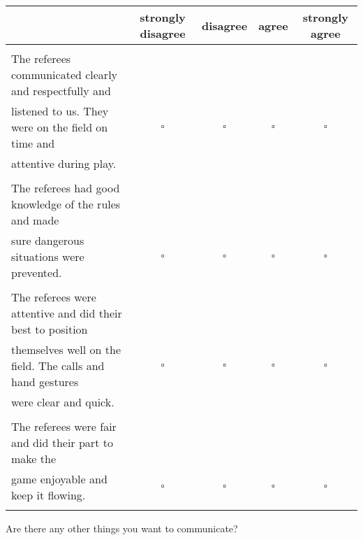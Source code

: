\documentclass{article}
\begin{document}
\begin{table}[H]
    \centering
    \begin{tabular}{l|cccc}
        \rowcolor{Gray}
        & strongly disagree & disagree & agree & strongly agree\\ \hline
        &&&& \\

        
        The referees communicated clearly and respectfully and & & & & \\listened to us. They were on the field on time and & $\square$ & $\square$ & $\square$ & $\square$ \\attentive during play.
        \\&&&& \\

        
The referees had good knowledge of the rules and made\\sure dangerous situations were prevented.
  & $\square$ & $\square$ & $\square$ & $\square$\\ 
        &&&& \\

        
The referees were attentive and did their best to position\\themselves well on the field. The calls and hand gestures & $\square$ & $\square$ & $\square$ & $\square$  \\were clear and quick.
\\
        &&&& \\

        
The referees were fair and did their part to make the\\game enjoyable and keep it flowing.
  & $\square$ & $\square$ & $\square$ & $\square$\\ 
        &&&& \\
    \hline

    \end{tabular}
\end{table}


Are there any other things you want to communicate?

\vspace{35pt}

\noindent{}\dotfill 
{}\dotfill
{}
\hdashrule{\textwidth}{0.4pt}{2pt}

\vspace{-10pt}
\end{document}
